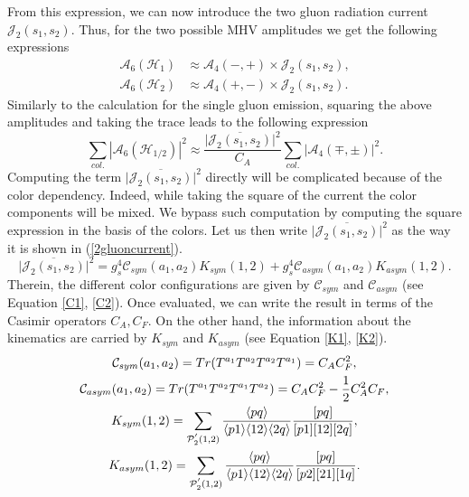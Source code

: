 From this expression, we can now introduce the two gluon radiation current $\mathcal{J}_2(s_1,s_2)$. Thus, for the two possible MHV amplitudes we get the following expressions
\begin{align}
\mathcal{A}_6(\mathcal{H}_1) & \approx \mathcal{A}_4(-,+) \times \mathcal{J}_2(s_1,s_2), \\
\mathcal{A}_6(\mathcal{H}_2) & \approx \mathcal{A}_4(+,-) \times \mathcal{J}_2(s_1,s_2).
\end{align} 
Similarly to the calculation for the single gluon emission, squaring the above amplitudes and taking the trace leads to the following expression
\begin{equation}
\sum_{col.} \left| \mathcal{A}_6(\mathcal{H}_{1/2}) \right|^2 \approx \frac{\vert \overline{\mathcal{J}_2(s_1,s_2)} \vert^2}{C_A} \sum_{col.} \left| \mathcal{A}_4(\mp , \pm) \right|^2.
\label{2gluonamp}
\end{equation}
Computing the term $\vert \overline{\mathcal{J}_2(s_1,s_2)} \vert^2$ directly will be complicated because of the color dependency. Indeed, while taking the square of the current the color components will be mixed. We bypass such computation by computing the square expression in the basis of the colors. Let us then write $\vert \overline{\mathcal{J}_2(s_1,s_2)} \vert^2$ as the way it is shown in (\ref{2gluoncurrent}).
\begin{equation}
\vert \overline{\mathcal{J}_2(s_1,s_2)} \vert^2 = g^4_s\mathcal{C}_{sym} (a_1,a_2) K_{sym} (1,2) +g^4_s \mathcal{C}_{asym} (a_1,a_2) K_{asym} (1,2).
\label{2gluoncurrent}
\end{equation}
Therein, the different color configurations are given by $\mathcal{C}_{sym}$ and $\mathcal{C}_{asym}$ (see Equation \ref{C1}, \ref{C2}). Once evaluated, we can write the result in terms of the Casimir operators $C_A,C_F$. On the other hand, the information about the kinematics are carried by $K_{sym}$ and $K_{asym}$ (see Equation \ref{K1}, \ref{K2}).
\begin{gather}
\mathcal{C}_{sym} (a_1,a_2) =Tr(T^{a_1}T^{a_2}T^{a_2}T^{a_1})=C_A C^2_F, \label{C1} \\
\mathcal{C}_{asym} (a_1,a_2) =Tr(T^{a_1}T^{a_2}T^{a_1}T^{a_2})=C_A C^2_F-\frac{1}{2}C^2_A C_F, \label{C2} \\
K_{sym}(1,2)= \sum_{\mathcal{P}^{'}_2(1,2)} \frac{\langle pq\rangle}{\langle p1\rangle \langle12\rangle \langle2q\rangle} \frac{[pq]}{[p1] [12] [2q]}, \label{K1} \\
K_{asym}(1,2)= \sum_{\mathcal{P}^{'}_2(1,2)} \frac{\langle pq\rangle}{\langle p1\rangle \langle12\rangle \langle2q\rangle} \frac{[pq]}{[p2] [21] [1q]}. \label{K2}
\end{gather}
